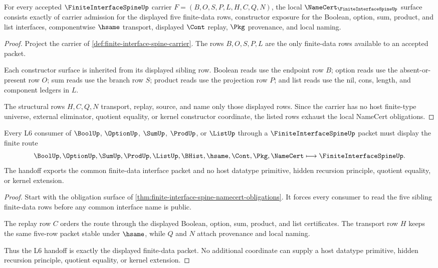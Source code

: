 \begin{theorem}
\label{thm:finite-interface-spine-namecert-obligations}
For every accepted $\FiniteInterfaceSpineUp$ carrier $F=(B,O,S,P,L,H,C,Q,N)$, the local $\NameCert_{\FiniteInterfaceSpineUp}$ surface consists exactly of carrier admission for the displayed five finite-data rows, constructor exposure for the Boolean, option, sum, product, and list interfaces, componentwise $\hsame$ transport, displayed $\Cont$ replay, $\Pkg$ provenance, and local naming.
\end{theorem}
\begin{proof}
Project the carrier of \autoref{def:finite-interface-spine-carrier}. The rows $B,O,S,P,L$ are the only finite-data rows available to an accepted packet.

Each constructor surface is inherited from its displayed sibling row. Boolean reads use the endpoint row $B$; option reads use the absent-or-present row $O$; sum reads use the branch row $S$; product reads use the projection row $P$; and list reads use the nil, cons, length, and component ledgers in $L$.

The structural rows $H,C,Q,N$ transport, replay, source, and name only those displayed rows. Since the carrier has no host finite-type universe, external eliminator, quotient equality, or kernel constructor coordinate, the listed rows exhaust the local NameCert obligations.
\end{proof}

\begin{theorem}
\label{thm:finite-interface-spine-lsix-handoff}
Every L6 consumer of $\BoolUp$, $\OptionUp$, $\SumUp$, $\ProdUp$, or $\ListUp$ through a $\FiniteInterfaceSpineUp$ packet must display the finite route
$$
\BoolUp,\OptionUp,\SumUp,\ProdUp,\ListUp,\BHist,\hsame,\Cont,\Pkg,\NameCert
\longmapsto
\FiniteInterfaceSpineUp .
$$
The handoff exports the common finite-data interface packet and no host datatype primitive, hidden recursion principle, quotient equality, or kernel extension.
\end{theorem}
\begin{proof}
Start with the obligation surface of \autoref{thm:finite-interface-spine-namecert-obligations}. It forces every consumer to read the five sibling finite-data rows before any common interface name is public.

The replay row $C$ orders the route through the displayed Boolean, option, sum, product, and list certificates. The transport row $H$ keeps the same five-row packet stable under $\hsame$, while $Q$ and $N$ attach provenance and local naming.

Thus the L6 handoff is exactly the displayed finite-data packet. No additional coordinate can supply a host datatype primitive, hidden recursion principle, quotient equality, or kernel extension.
\end{proof}

